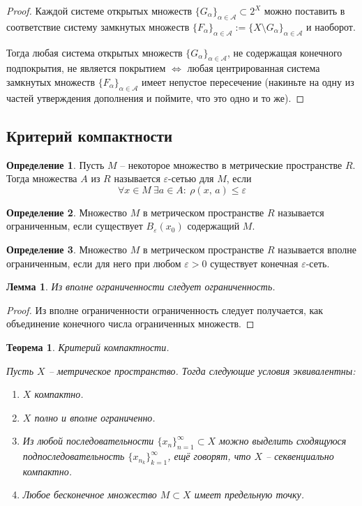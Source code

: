 \documentclass[a4paper,12pt]{article}
\renewcommand{\leq}{\ensuremath{\leqslant}}
\theoremstyle{plain}
\newtheorem{theorem}{Теорема}[section]
\newtheorem{lemma}{Лемма}[section]
\theoremstyle{definition}
\newtheorem{definition}{Определение}[section]
\theoremstyle{remark}
\begin{document}
\begin{proof}
	Каждой системе открытых множеств $\{G_\alpha\}_{\alpha \in \mathcal{A}} \subset 2^X$ можно поставить в соответствие систему замкнутых множеств $\{F_\alpha\}_{\alpha \in \mathcal{A}} := \{X \setminus G_\alpha\}_{\alpha \in \mathcal{A}}$ и наоборот.

	Тогда любая система открытых множеств $\{G_\alpha\}_{\alpha \in \mathcal{A}}$, не содержащая конечного подпокрытия, не является покрытием $\Leftrightarrow$ любая центрированная система замкнутых множеств $\{F_\alpha\}_{\alpha \in \mathcal{A}}$ имеет непустое пересечение (накиньте на одну из частей утверждения дополнения и поймите, что это одно и то же).
\end{proof}

\subsection{Критерий компактности}
\begin{definition}
	Пусть $M$ -- некоторое множество в метрические пространстве $R$. Тогда множества $A$ из $R$ называется $\varepsilon$-сетью для $M$, если
	\[
		\forall x \in M \: \exists a \in A :\: \rho(x,\, a) \leq \varepsilon
	\]
\end{definition}

\begin{definition}
	Множество $M$ в метрическом пространстве $R$ называется ограниченным, если существует $B_\varepsilon(x_0)$ содержащий $M$.
\end{definition}

\begin{definition}
	Множество $M$ в метрическом пространстве $R$ называется вполне ограниченным, если для него при любом $\varepsilon > 0$ существует конечная $\varepsilon$-сеть.
\end{definition}

\begin{lemma}
	Из вполне ограниченности следует ограниченность.
\end{lemma}

\begin{proof}
	Из вполне ограниченности ограниченность следует получается, как объединение конечного числа ограниченных множеств.
\end{proof}

\begin{theorem}
	Критерий компактности.

	Пусть $X$ -- метрическое пространство. Тогда следующие условия эквивалентны:
	\begin{enumerate}
		\item $X$ компактно.
		\item $X$ полно и вполне ограниченно.
		\item Из любой последовательности $\{x_n\}_{n = 1}^\infty \subset X$ можно выделить сходящуюся подпоследовательность $\{x_{n_k}\}_{k = 1}^\infty$, ещё говорят, что $X$ -- секвенциально компактно.
		\item Любое бесконечное множество $M \subset X$ имеет предельную точку.
	\end{enumerate}
\end{theorem}
\end{document}
